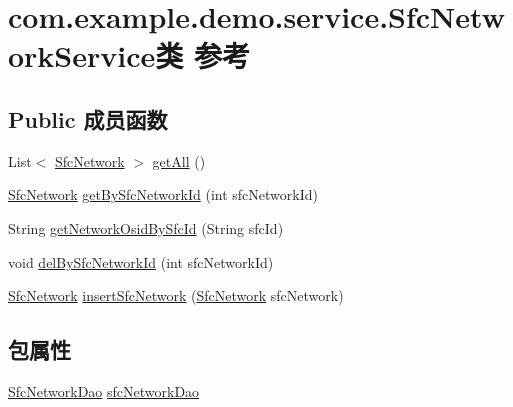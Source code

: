 \hypertarget{classcom_1_1example_1_1demo_1_1service_1_1_sfc_network_service}{}\section{com.\+example.\+demo.\+service.\+Sfc\+Network\+Service类 参考}
\label{classcom_1_1example_1_1demo_1_1service_1_1_sfc_network_service}
\subsection*{Public 成员函数}
\begin{DoxyCompactItemize}
\item 
List$<$ \mbox{\hyperlink{classcom_1_1example_1_1demo_1_1modular_1_1_sfc_network}{Sfc\+Network}} $>$ \mbox{\hyperlink{classcom_1_1example_1_1demo_1_1service_1_1_sfc_network_service_a67c49162f29c3eae178ff456827614b3}{get\+All}} ()
\item 
\mbox{\hyperlink{classcom_1_1example_1_1demo_1_1modular_1_1_sfc_network}{Sfc\+Network}} \mbox{\hyperlink{classcom_1_1example_1_1demo_1_1service_1_1_sfc_network_service_a395680f5cd3071731237ad49dcb3c666}{get\+By\+Sfc\+Network\+Id}} (int sfc\+Network\+Id)
\item 
String \mbox{\hyperlink{classcom_1_1example_1_1demo_1_1service_1_1_sfc_network_service_abcd59f70e3fd080b43f360e6b41b0abe}{get\+Network\+Osid\+By\+Sfc\+Id}} (String sfc\+Id)
\item 
void \mbox{\hyperlink{classcom_1_1example_1_1demo_1_1service_1_1_sfc_network_service_acfe62bebe91d4b10fd5f87aae97508d1}{del\+By\+Sfc\+Network\+Id}} (int sfc\+Network\+Id)
\item 
\mbox{\hyperlink{classcom_1_1example_1_1demo_1_1modular_1_1_sfc_network}{Sfc\+Network}} \mbox{\hyperlink{classcom_1_1example_1_1demo_1_1service_1_1_sfc_network_service_ac5d98ef725205189c5420d775254c0d2}{insert\+Sfc\+Network}} (\mbox{\hyperlink{classcom_1_1example_1_1demo_1_1modular_1_1_sfc_network}{Sfc\+Network}} sfc\+Network)
\end{DoxyCompactItemize}
\subsection*{包属性}
\begin{DoxyCompactItemize}
\item 
\mbox{\hyperlink{interfacecom_1_1example_1_1demo_1_1dao_1_1_sfc_network_dao}{Sfc\+Network\+Dao}} \mbox{\hyperlink{classcom_1_1example_1_1demo_1_1service_1_1_sfc_network_service_ac0d840b41b77a05ac1662e012f274789}{sfc\+Network\+Dao}}
\end{DoxyCompactItemize}


